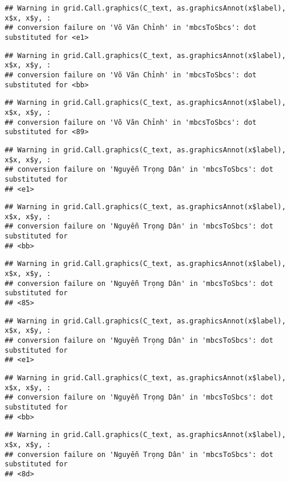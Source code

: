 \documentclass[
]{article}
\begin{document}
\begin{verbatim}
## Warning in grid.Call.graphics(C_text, as.graphicsAnnot(x$label), x$x, x$y, :
## conversion failure on 'Võ Văn Chỉnh' in 'mbcsToSbcs': dot substituted for <e1>
\end{verbatim}

\begin{verbatim}
## Warning in grid.Call.graphics(C_text, as.graphicsAnnot(x$label), x$x, x$y, :
## conversion failure on 'Võ Văn Chỉnh' in 'mbcsToSbcs': dot substituted for <bb>
\end{verbatim}

\begin{verbatim}
## Warning in grid.Call.graphics(C_text, as.graphicsAnnot(x$label), x$x, x$y, :
## conversion failure on 'Võ Văn Chỉnh' in 'mbcsToSbcs': dot substituted for <89>
\end{verbatim}

\begin{verbatim}
## Warning in grid.Call.graphics(C_text, as.graphicsAnnot(x$label), x$x, x$y, :
## conversion failure on 'Nguyễn Trọng Dân' in 'mbcsToSbcs': dot substituted for
## <e1>
\end{verbatim}

\begin{verbatim}
## Warning in grid.Call.graphics(C_text, as.graphicsAnnot(x$label), x$x, x$y, :
## conversion failure on 'Nguyễn Trọng Dân' in 'mbcsToSbcs': dot substituted for
## <bb>
\end{verbatim}

\begin{verbatim}
## Warning in grid.Call.graphics(C_text, as.graphicsAnnot(x$label), x$x, x$y, :
## conversion failure on 'Nguyễn Trọng Dân' in 'mbcsToSbcs': dot substituted for
## <85>
\end{verbatim}

\begin{verbatim}
## Warning in grid.Call.graphics(C_text, as.graphicsAnnot(x$label), x$x, x$y, :
## conversion failure on 'Nguyễn Trọng Dân' in 'mbcsToSbcs': dot substituted for
## <e1>
\end{verbatim}

\begin{verbatim}
## Warning in grid.Call.graphics(C_text, as.graphicsAnnot(x$label), x$x, x$y, :
## conversion failure on 'Nguyễn Trọng Dân' in 'mbcsToSbcs': dot substituted for
## <bb>
\end{verbatim}

\begin{verbatim}
## Warning in grid.Call.graphics(C_text, as.graphicsAnnot(x$label), x$x, x$y, :
## conversion failure on 'Nguyễn Trọng Dân' in 'mbcsToSbcs': dot substituted for
## <8d>
\end{verbatim}
\end{document}
